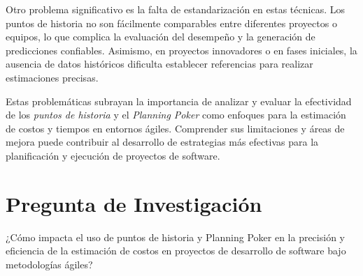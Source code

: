 Otro problema significativo es la falta de estandarización en estas técnicas. Los puntos de historia no son fácilmente comparables entre diferentes proyectos o equipos, lo que complica la evaluación del desempeño y la generación de predicciones confiables. Asimismo, en proyectos innovadores o en fases iniciales, la ausencia de datos históricos dificulta establecer referencias para realizar estimaciones precisas.

Estas problemáticas subrayan la importancia de analizar y evaluar la efectividad de los \textit{puntos de historia} y el \textit{Planning Poker} como enfoques para la estimación de costos y tiempos en entornos ágiles. Comprender sus limitaciones y áreas de mejora puede contribuir al desarrollo de estrategias más efectivas para la planificación y ejecución de proyectos de software.

\section{Pregunta de Investigación}
¿Cómo impacta el uso de puntos de historia y Planning Poker en la precisión y eficiencia de la estimación de costos en proyectos de desarrollo de software bajo metodologías ágiles?
